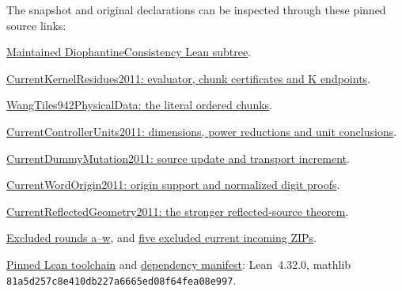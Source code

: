 \documentclass[11pt,letterpaper]{article}
\begin{document}
The snapshot and original declarations can be inspected through these pinned source links:
\begin{enumerate}[label={[\arabic*]}]
\item \href{https://github.com/VladimirReshetnikov/ProveIt/tree/e1c8914bc7064d9a8e7c06171a18069a949badd0/Computability/DiophantineConsistency/Lean}{Maintained DiophantineConsistency Lean subtree}.
\item \href{https://github.com/VladimirReshetnikov/ProveIt/blob/e1c8914bc7064d9a8e7c06171a18069a949badd0/Computability/DiophantineConsistency/Lean/DiophantineConsistency/CurrentKernelResidues2011.lean}{CurrentKernelResidues2011: evaluator, chunk certificates and K endpoints}.
\item \href{https://github.com/VladimirReshetnikov/ProveIt/blob/e1c8914bc7064d9a8e7c06171a18069a949badd0/Computability/DiophantineConsistency/Lean/DiophantineConsistency/WangTiles942PhysicalData.lean}{WangTiles942PhysicalData: the literal ordered chunks}.
\item \href{https://github.com/VladimirReshetnikov/ProveIt/blob/e1c8914bc7064d9a8e7c06171a18069a949badd0/Computability/DiophantineConsistency/Lean/DiophantineConsistency/CurrentControllerUnits2011.lean}{CurrentControllerUnits2011: dimensions, power reductions and unit conclusions}.
\item \href{https://github.com/VladimirReshetnikov/ProveIt/blob/e1c8914bc7064d9a8e7c06171a18069a949badd0/Computability/DiophantineConsistency/Lean/DiophantineConsistency/CurrentDummyMutation2011.lean}{CurrentDummyMutation2011: source update and transport increment}.
\item \href{https://github.com/VladimirReshetnikov/ProveIt/blob/e1c8914bc7064d9a8e7c06171a18069a949badd0/Computability/DiophantineConsistency/Lean/DiophantineConsistency/CurrentWordOrigin2011.lean}{CurrentWordOrigin2011: origin support and normalized digit proofs}.
\item \href{https://github.com/VladimirReshetnikov/ProveIt/blob/e1c8914bc7064d9a8e7c06171a18069a949badd0/Computability/DiophantineConsistency/Lean/DiophantineConsistency/CurrentReflectedGeometry2011.lean}{CurrentReflectedGeometry2011: the stronger reflected-source theorem}.
\item \href{https://github.com/VladimirReshetnikov/ProveIt/tree/e1c8914bc7064d9a8e7c06171a18069a949badd0/Computability/DiophantineConsistency/research/lean-proof-simplification}{Excluded rounds a--w}, and \href{https://github.com/VladimirReshetnikov/ProveIt/tree/e1c8914bc7064d9a8e7c06171a18069a949badd0/docs/incoming}{five excluded current incoming ZIPs}.
\item \href{https://github.com/VladimirReshetnikov/ProveIt/blob/e1c8914bc7064d9a8e7c06171a18069a949badd0/lean-toolchain}{Pinned Lean toolchain} and \href{https://github.com/VladimirReshetnikov/ProveIt/blob/e1c8914bc7064d9a8e7c06171a18069a949badd0/lake-manifest.json}{dependency manifest}: Lean~4.32.0, mathlib \nolinkurl{81a5d257c8e410db227a6665ed08f64fea08e997}.
\end{enumerate}
\end{document}
